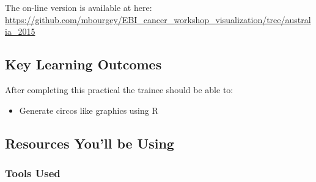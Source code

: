 



\chapter{\moduleTitle}


\newpage


The on-line version is available at here:
\url{https://github.com/mbourgey/EBI_cancer_workshop_visualization/tree/australia_2015}

\section{Key Learning Outcomes}

After completing this practical the trainee should be able to:

\begin{itemize}
  \item Generate circos like graphics using R
\end{itemize}


\section{Resources You'll be Using}

\subsection{Tools Used}

